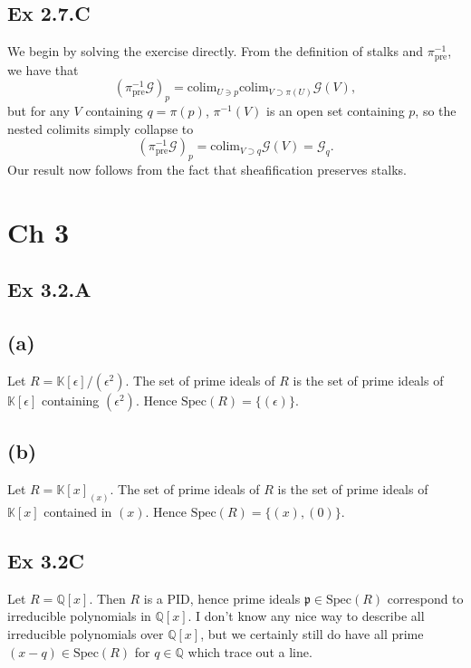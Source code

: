 \documentclass{article}
\theoremstyle{definition}
\newcommand{\Q}{\mathbb{Q}}
\newcommand{\K}{\mathbb{K}}
\newcommand{\Spec}{\text{Spec}}
\newcommand{\colim}{\text{colim}}
\begin{document}
\subsection*{Ex 2.7.C}

We begin by solving the exercise directly. From the definition of stalks
and $\pi^{-1}_{\text{pre}}$, we have that
\[
	(\pi^{-1}_{\text{pre}}\mathcal{G})_p
	=
	\colim_{U \ni p}
	\colim_{V \supset \pi(U)}
	\mathcal{G}(V),
\]
but for any $V$ containing $q = \pi(p)$, $\pi^{-1}(V)$ is an open set containing $p$,
so the nested colimits simply collapse to
\[
	(\pi^{-1}_{\text{pre}}\mathcal{G})_p
	=
	\colim_{V \supset q}
	\mathcal{G}(V)
	=
	\mathcal{G}_{q}.
\]
Our result now follows from the fact that sheafification preserves stalks. \\


\section*{Ch 3}

\subsection*{Ex 3.2.A}

\subsection*{(a)}

Let $R = \K[\epsilon]/(\epsilon^2)$. The set of prime ideals of $R$ is the set
of prime ideals of $\K[\epsilon]$ containing $(\epsilon^2)$. Hence $\Spec(R) =
	\{(\epsilon)\}$.

\subsection*{(b)}

Let $R = \K[x]_{(x)}$. The set of prime ideals of $R$ is the set of prime
ideals of $\K[x]$ contained in $(x)$. Hence $\Spec(R) = \{(x), (0)\}$.


\subsection*{Ex 3.2C}

Let $R = \Q[x]$. Then $R$ is a PID, hence prime ideals $\mathfrak{p} \in
	\Spec(R)$ correspond to irreducible polynomials in $\Q[x]$. I don't know any
nice way to describe all irreducible polynomials over $\Q[x]$, but we certainly
still do have all prime $(x - q) \in \Spec(R)$ for $q \in \Q$ which trace out a
line.
\end{document}
